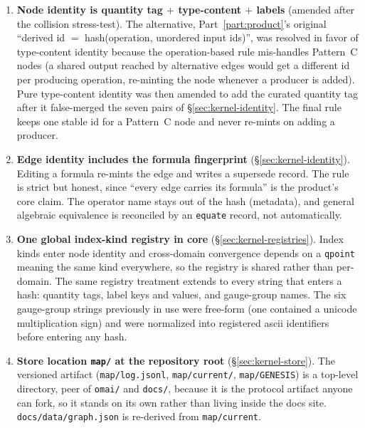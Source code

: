 \documentclass[11pt,a4paper]{article}
\begin{document}
\begin{enumerate}[leftmargin=2em, itemsep=0.4em]
  \item \textbf{Node identity is quantity tag $+$ type-content $+$ labels}
        (amended after the collision stress-test). The alternative,
        Part~\ref{part:product}'s original ``derived id $=$ hash(operation,
        unordered input ids)'', was resolved in favor of type-content identity
        because the operation-based rule mis-handles Pattern~C nodes (a shared
        output reached by alternative edges would get a different id per
        producing operation, re-minting the node whenever a producer is added).
        Pure type-content identity was then amended to add the curated quantity
        tag after it false-merged the seven pairs of
        \S\ref{sec:kernel-identity}. The final rule keeps one stable id for a
        Pattern~C node and never re-mints on adding a producer.
  \item \textbf{Edge identity includes the formula fingerprint}
        (\S\ref{sec:kernel-identity}). Editing a formula re-mints the edge and
        writes a supersede record. The rule is strict but honest, since ``every
        edge carries its formula'' is the product's core claim. The operator name
        stays out of the hash (metadata), and general algebraic equivalence is
        reconciled by an \texttt{equate} record, not automatically.
  \item \textbf{One global index-kind registry in core}
        (\S\ref{sec:kernel-registries}). Index kinds enter node identity and
        cross-domain convergence depends on a \texttt{qpoint} meaning the same
        kind everywhere, so the registry is shared rather than per-domain. The
        same registry treatment extends to every string that enters a hash:
        quantity tags, label keys and values, and gauge-group names. The six
        gauge-group strings previously in use were free-form (one contained a
        unicode multiplication sign) and were normalized into registered ascii
        identifiers before entering any hash.
  \item \textbf{Store location \texttt{map/} at the repository root}
        (\S\ref{sec:kernel-store}). The versioned artifact
        (\texttt{map/log.jsonl}, \texttt{map/current/}, \texttt{map/GENESIS}) is a
        top-level directory, peer of \texttt{omai/} and \texttt{docs/}, because it
        is the protocol artifact anyone can fork, so it stands on its own rather
        than living inside the docs site. \texttt{docs/data/graph.json} is
        re-derived from \texttt{map/current}.
\end{enumerate}
\end{document}
